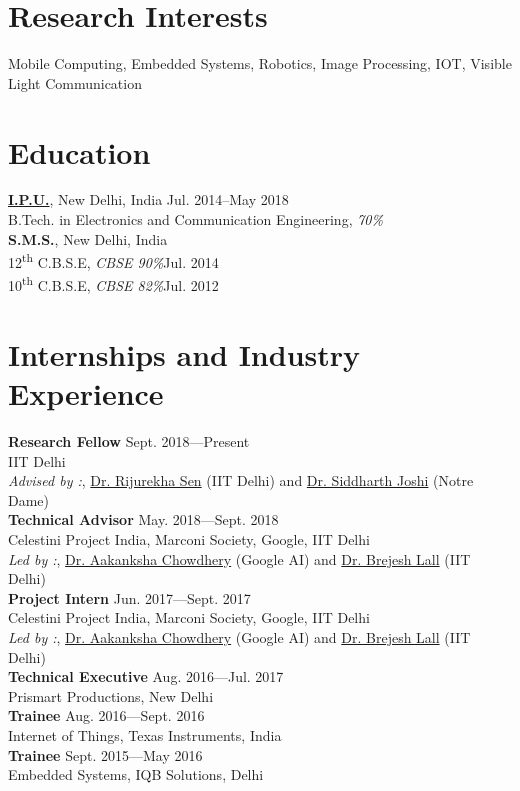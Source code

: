 \section{Research Interests}
Mobile Computing, Embedded Systems, Robotics, Image Processing, IOT, Visible Light Communication

\section{Education}
\href{http://bvcoend.ac.in}{\textbf{I.P.U.}},
New Delhi, India \hfill{Jul. 2014--May 2018}\\
B.Tech. in Electronics and Communication Engineering, \emph{70\%}\\
\textbf{S.M.S.},
New Delhi, India \\
12\textsuperscript{th} C.B.S.E, \emph{CBSE 90\%}\hfill{Jul. 2014}\\
10\textsuperscript{th} C.B.S.E, \emph{CBSE 82\%}\hfill{Jul. 2012}\\


\section{Internships and Industry Experience}

\textbf{Research Fellow} \hfill {Sept. 2018---Present}\\
IIT Delhi\\
\emph{Advised by :}, \href{http://www.cse.iitd.ernet.in/~rijurekha/index.html}{Dr. Rijurekha Sen} (IIT Delhi) and \href{http://isn.ucsd.edu/~siddharth/}{Dr. Siddharth Joshi} (Notre Dame)\\
\textbf{Technical Advisor} \hfill {May. 2018---Sept. 2018}\\
Celestini Project India, Marconi Society, Google, IIT Delhi\\
\emph{Led by :}, \href{http://www.achowdhery.com/}{Dr. Aakanksha Chowdhery} (Google AI) and \href{http://ee.iitd.ernet.in/people/brijeshlall.html}{Dr. Brejesh Lall} (IIT Delhi)\\
\textbf{Project Intern} \hfill {Jun. 2017---Sept. 2017}\\
Celestini Project India, Marconi Society, Google, IIT Delhi\\
\emph{Led by :}, \href{http://www.achowdhery.com/}{Dr. Aakanksha Chowdhery} (Google AI) and \href{http://ee.iitd.ernet.in/people/brijeshlall.html}{Dr. Brejesh Lall} (IIT Delhi)\\
\textbf{Technical Executive} \hfill {Aug. 2016---Jul. 2017}\\
Prismart Productions, New Delhi\\
\textbf{Trainee} \hfill {Aug. 2016---Sept. 2016}\\
Internet of Things, Texas Instruments, India\\
\textbf{Trainee} \hfill {Sept. 2015---May 2016}\\
Embedded Systems, IQB Solutions, Delhi\\

